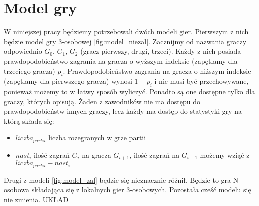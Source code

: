 \section{Model gry}
W niniejszej pracy będziemy potrzebowali dwóch modeli gier. Pierwszym z nich będzie model gry 3-osobowej \ref{fig:model_niezal}. Zacznijmy od nazwania graczy odpowiednio $G_0$, $G_1$, $G_2$ (gracz pierwszy, drugi, trzeci). Każdy z nich posiada prawdopodobieństwo zagrania na gracza o wyższym indeksie (zapętlamy dla trzeciego gracza) $p_i$. Prawdopodobieństwo zagrania na gracza o niższym indeksie (zapętlamy dla pierwszego gracza) wynosi $1 - p_i$ i nie musi być przechowywane, ponieważ możemy to w łatwy sposób wyliczyć. Ponadto są one dostępne tylko dla graczy, których opisują. Żaden z zawodników nie ma dostępu do prawdopodobieństw innych graczy, lecz każdy ma dostęp do statystyki gry na którą składa się:
\begin{itemize}
\item $liczba_{partii}$ liczba rozegranych w grze partii
\item $nast_i$ ilość zagrań $G_i$ na gracza $G_{i+1}$, ilość zagrań na $G_{i-1}$ możemy wziąć z $liczba_{partii} - nast_i$
\end{itemize}
Drugi z modeli \ref{fig:model_zal} będzie się nieznacznie różnił. Będzie to gra N-osobowa składająca się z lokalnych gier 3-osobowych. Pozostała cześć modelu się nie zmienia.
{\color{red} UKŁAD}
